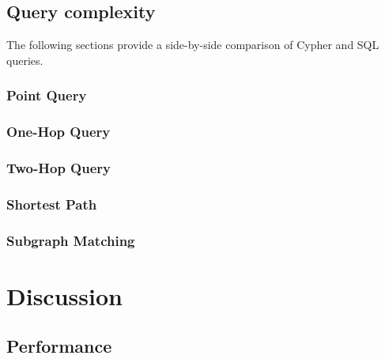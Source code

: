 \documentclass[11pt, a4paper,oneside,chapterprefix=false]{scrbook}
\begin{document}
\section{Query complexity}

The following sections provide a side-by-side comparison of Cypher and SQL queries.

\subsection{Point Query} \label{sec:result:point}


\subsection{One-Hop Query}\label{sec:result:one-hop}


\subsection{Two-Hop Query} \label{sec:result:two-hop}


\subsection{Shortest Path} \label{sec:result:shortest-path}


\subsection{Subgraph Matching} \label{sec:result:subgraph-matching}





\chapter{Discussion} \label{chp:Discussion}

\section{Performance}
\end{document}
